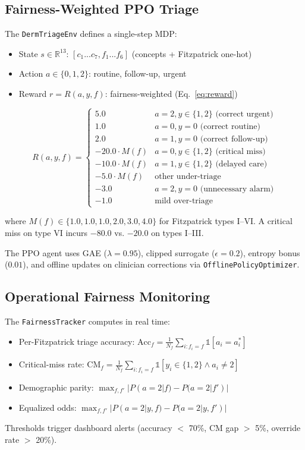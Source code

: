 \documentclass[12pt,a4paper]{article}
\begin{document}
\subsection{Fairness-Weighted PPO Triage}
\label{sec:rl_reward}
The \texttt{DermTriageEnv} defines a single-step MDP:
\begin{itemize}
    \item State $s \in \mathbb{R}^{13}$: $[c_1...c_7, f_1...f_6]$ (concepts + Fitzpatrick one-hot)
    \item Action $a \in \{0,1,2\}$: routine, follow-up, urgent
    \item Reward $r = R(a, y, f)$: fairness-weighted (Eq.~\ref{eq:reward})
\end{itemize}

\begin{equation}
\label{eq:reward}
R(a, y, f) = \begin{cases}
5.0 & a = 2, y \in \{1,2\} \text{ (correct urgent)} \\
1.0 & a = 0, y = 0 \text{ (correct routine)} \\
2.0 & a = 1, y = 0 \text{ (correct follow-up)} \\
-20.0 \cdot M(f) & a = 0, y \in \{1,2\} \text{ (critical miss)} \\
-10.0 \cdot M(f) & a = 1, y \in \{1,2\} \text{ (delayed care)} \\
-5.0 \cdot M(f) & \text{other under-triage} \\
-3.0 & a = 2, y = 0 \text{ (unnecessary alarm)} \\
-1.0 & \text{mild over-triage}
\end{cases}
\end{equation}

where $M(f) \in \{1.0, 1.0, 1.0, 2.0, 3.0, 4.0\}$ for Fitzpatrick types I--VI. A critical miss on type VI incurs $-80.0$ vs. $-20.0$ on types I--III.

The PPO agent uses GAE ($\lambda=0.95$), clipped surrogate ($\epsilon=0.2$), entropy bonus ($0.01$), and offline updates on clinician corrections via \texttt{OfflinePolicyOptimizer}.

\subsection{Operational Fairness Monitoring}
The \texttt{FairnessTracker} computes in real time:
\begin{itemize}
    \item Per-Fitzpatrick triage accuracy: $\text{Acc}_f = \frac{1}{N_f}\sum_{i:f_i=f} \mathbb{1}[a_i = a^*_i]$
    \item Critical-miss rate: $\text{CM}_f = \frac{1}{N_f}\sum_{i:f_i=f} \mathbb{1}[y_i \in \{1,2\} \land a_i \neq 2]$
    \item Demographic parity: $\max_{f,f'} |P(a=2|f) - P(a=2|f')|$
    \item Equalized odds: $\max_{f,f'} |P(a=2|y,f) - P(a=2|y,f')|$
\end{itemize}
Thresholds trigger dashboard alerts (accuracy $<$ 70\%, CM gap $>$ 5\%, override rate $>$ 20\%).
\end{document}
